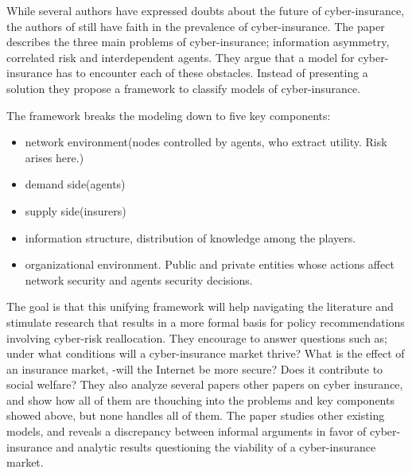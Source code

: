 
While several authors have expressed doubts about the future of cyber-insurance, the authors of \cite{bohme2010modeling} still have faith in the prevalence of cyber-insurance. The paper describes the three main problems of cyber-insurance; information asymmetry, correlated risk and interdependent agents. They argue that a model for cyber-insurance has to encounter each of these obstacles. Instead of presenting a solution they propose a framework to classify models of cyber-insurance. 

The framework breaks the modeling down to five key components: 
\begin{itemize}[topsep=-1em,parsep=0em,itemsep=0em] 
 \item network environment(nodes controlled by agents, who extract utility. Risk arises here.)
 \item demand side(agents) 
 \item supply side(insurers) 
 \item information structure, distribution of knowledge among the players. 
 \item organizational environment. Public and private entities whose actions affect network security and agents security decisions.
 
\end{itemize}
The goal is that this unifying framework will help navigating the literature and stimulate research that results in a more formal basis for policy recommendations involving cyber-risk reallocation. They encourage to answer questions such as; under what conditions will a cyber-insurance market thrive? What is the effect of an insurance market, -will the Internet be more secure? Does it contribute to social welfare?
They also analyze several papers other papers on cyber insurance, and show how all of them are thouching into the problems and key components showed above, but none handles all of them.
The paper studies other existing models, and reveals a discrepancy between informal arguments in favor of cyber-insurance and analytic results questioning the viability of a cyber-insurance market. 

